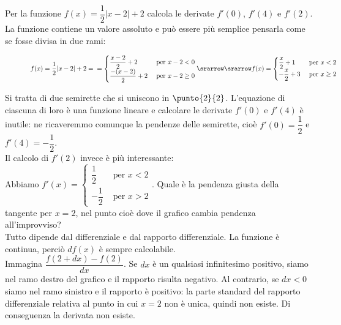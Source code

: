 \begin{esempio}
 Per la funzione $f(x)=\dfrac{1}{2}|x-2|+2$ calcola le derivate $f'(0)$, $f'(4)$
 e $f'(2)$.\\
 La funzione contiene un valore assoluto e può essere più semplice pensarla 
 come se fosse divisa in due rami:

\begin{figure}[h!]
\begin{inaccessibleblock}
 \begin{center}
 \begin{minipage}[]{.40 \textwidth}
  \derivavalass
  \caption{}
 \end{minipage} 
 \hfill
 \begin{minipage}[]{.58 \textwidth}
$f(x)= \dfrac{1}{2}|x-2|+2=\\
=\begin{cases}
  \dfrac{x-2}{2}+2 &\text{ per } x-2< 0  \\
 \dfrac{-(x-2)}{2}+2 &\text{ per } x-2 \ge 0
\end{cases} 
\srarrow\\
\srarrow f(x)= \begin{cases}
 \dfrac{x}{2}+1 &\text{ per } x<2 \\
 -\dfrac{x}{2}+3 &\text{ per } x\ge 2
\end{cases}$
\end{minipage}
\end{center}
\end{inaccessibleblock}
\label{}
\end{figure} 

Si tratta di due semirette che si uniscono in $\punto{2}{2}$. L'equazione
di ciascuna di loro è una funzione lineare e calcolare le derivate $f'(0)$
e $f'(4)$ è inutile: ne ricaveremmo comunque la pendenze delle semirette, cioè
$f'(0)=\dfrac{1}{2}$ e $f'(4)=-\dfrac{1}{2}$.\\
Il calcolo di $f'(2)$ invece è più interessante:\\
Abbiamo
$f'(x)= \begin{cases}
 \dfrac{1}{2} &\text{ per } x<2 \\
 -\dfrac{1}{2} &\text{ per } x > 2
\end{cases}$.
Quale è la pendenza giusta della tangente per
$x=2$, nel punto cioè dove il grafico cambia pendenza all'improvviso?\\
Tutto dipende dal differenziale e dal rapporto differenziale.
La funzione è continua, perciò $df(x)$ è sempre calcolabile.\\
Immagina $\dfrac{f(2+dx)-f(2)}{dx}$.
Se $dx$ è un qualsiasi infinitesimo positivo, siamo nel ramo destro del grafico
e il rapporto risulta negativo. Al contrario, se $dx<0$ siamo nel ramo
sinistro e il rapporto è positivo: la parte standard del rapporto differenziale
relativa al punto in cui $x=2$ non è unica, quindi non esiste.
Di conseguenza la derivata non esiste.
\end{esempio}


